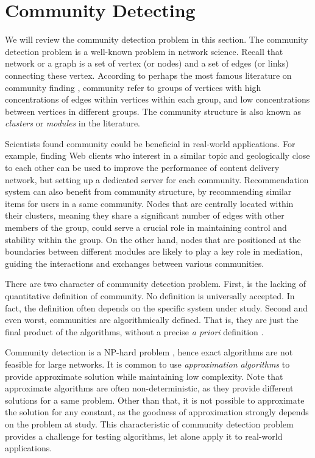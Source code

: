 \section{Community Detecting}

We will review the community detection problem in this section.
The community detection problem is a well-known problem in network science.
Recall that network or a graph is a set of vertex (or nodes) and a set of edges (or links) connecting these vertex.
According to perhaps the most famous literature on community finding \parencite{fortunato2010},
community refer to groups of vertices with high concentrations of edges within vertices within each group,
and low concentrations between vertices in different groups.
The community structure is also known as \textit{clusters} or \textit{modules} in the literature.

Scientists found community could be beneficial in real-world applications.
For example, finding Web clients who interest in a similar topic and geologically close to each other
can be used to improve the performance of content delivery network,
but setting up a dedicated server for each community.
Recommendation system can also benefit from community structure, by recommending similar items for users in a same community.
Nodes that are centrally located within their clusters,
meaning they share a significant number of edges with other members of the group,
could serve a crucial role in maintaining control and stability within the group.
On the other hand, nodes that are positioned at the boundaries between different modules
are likely to play a key role in mediation,
guiding the interactions and exchanges between various communities.

There are two character of community detection problem.
First, is the lacking of quantitative definition of community.
No definition is universally accepted.
In fact, the definition often depends on the specific system under study.
Second and even worst, communities are algorithmically defined.
That is, they are just the final product of the algorithms,
without a precise \textit{a priori} definition \parencite{fortunato2010}.

Community detection is a NP-hard problem \parencite{fortunato2010},
hence exact algorithms are not feasible for large networks.
It is common to use \textit{approximation algorithms} to provide approximate solution while maintaining low complexity.
Note that approximate algorithms are often non-deterministic, as they provide different solutions for a same problem.
Other than that, it is not possible to approximate the solution for any constant,
as the goodness of approximation strongly depends on the problem at study.
This characteristic of community detection problem provides a challenge for
testing algorithms, let alone apply it to real-world applications.

